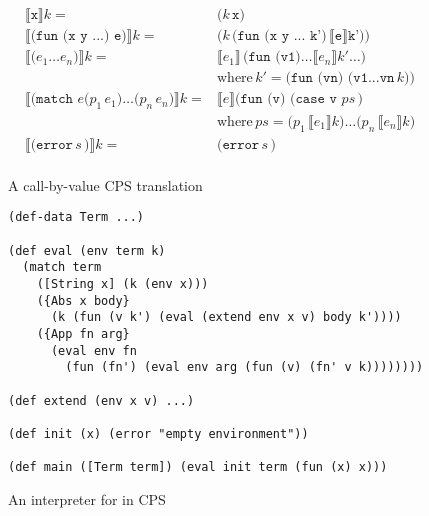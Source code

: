 \begin{figure}
    \centering
   \begin{align*}
        \llbracket \texttt{x} \rrbracket k =& \texttt{(}k\,\texttt{x)}\\
%
        \llbracket \texttt{(fun (x y ...) e)} \rrbracket k
        =& \texttt{(} k \, \texttt{(fun (x y ... k')}\, \llbracket \texttt{e} \rrbracket \texttt{k'))} \\
%        
        \llbracket \texttt{(}e_1\ldots e_n\texttt{)} \rrbracket k
        =& \llbracket e_1 \rrbracket \, \texttt{(fun (v1)} \ldots \llbracket e_n \rrbracket k' \ldots \texttt{)}\, \\
         & \text{where}\,k' = \texttt{(fun (vn) (v1...vn}\,k\texttt{))} \\
%        
        \llbracket \texttt{(match } e \texttt{(} p_1\,e_1\texttt{)}\ldots \texttt{(} p_n\,e_n\texttt{)} \rrbracket k
        =& \llbracket e \rrbracket \texttt{(fun (v) (case v }ps \,\texttt{)}\\
         & \text{where}\,ps = \texttt{(} p_1\,\llbracket e_1 \rrbracket k  \texttt{)}\ldots \texttt{(} p_n\,\llbracket e_n \rrbracket k \texttt{)}\\
%
        \llbracket \texttt{(error}\,s\,\texttt{)} \rrbracket k
        =& \texttt{(error}\,s\,\texttt{)} \\
   \end{align*}
    \caption{A call-by-value CPS translation}
    \label{fig:cps-translation}
\end{figure}

\begin{figure}
    \centering
\begin{lstlisting}
(def-data Term ...)

(def eval (env term k)
  (match term
    ([String x] (k (env x)))
    ({Abs x body}
      (k (fun (v k') (eval (extend env x v) body k'))))
    ({App fn arg}
      (eval env fn 
        (fun (fn') (eval env arg (fun (v) (fn' v k))))))))
    
(def extend (env x v) ...)
    
(def init (x) (error "empty environment"))
    
(def main ([Term term]) (eval init term (fun (x) x)))
\end{lstlisting}
    \caption{An interpreter for \LC{} in CPS}
    \label{fig:lambda-calc-interp-cps}
\end{figure}

